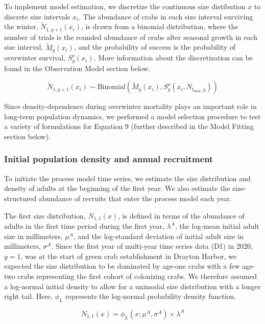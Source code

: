 \documentclass{article}
\begin{document}
To implement model estimation, we discretize the continuous size distibution $x$ to discrete size intervals $x_i$. The abundance of crabs in each size interval surviving the winter, $\tilde{N}_{1,y+1}(x_i)$, is drawn from a binomial distribution, where the number of trials is the rounded abundance of crabs after seasonal growth in each size interval, $\tilde{M}_y(x_i)$, and the probability of success is the probability of overwinter survival, $S^o_y(x_i)$. More information about the discretization can be found in the Observation Model section below.

\begin{equation}
\tilde{N}_{1,y+1}(x_i) \sim \text{Binomial}\left(\tilde{M}_y(x_i),  S_y^o(x_i, N_{t_{\text{max}},y})\right)
\end{equation}

Since density-dependence during overwinter mortality plays an important role in long-term population dynamics, we performed a model selection procedure to test a variety of formulations for Equation 9 (further described in the Model Fitting section below).

\subsubsection*{Initial population density and annual recruitment}

To initiate the process model time series, we estimate the size distribution and density of adults at the beginning of the first year. We also estimate the size-structured abundance of recruits that enter the process model each year. 

The first size distribution, $N_{1, 1}(x)$, is defined in terms of the abundance of adults in the first time period during the first year, $\lambda^{A}$, the log-mean initial adult size in millimeters, $\mu^A$, and the log-standard deviation of initial adult size in millimeters, $\sigma^A$. Since the first year of multi-year time series data (D1) in 2020, $y = 1$, was at the start of green crab establishment in Drayton Harbor, we expected the size distribution to be dominated by age-one crabs with a few age-two crabs representing the first cohort of colonizing crabs. We therefore assumed a log-normal initial density to allow for a unimodal size distribution with a longer right tail. Here, $\phi_L$ represents the log-normal probability density function.

\begin{equation}
N_{1, 1}(x) = \phi_L(x; \mu^A, \sigma^A) \times \lambda^A
\end{equation}
\end{document}
